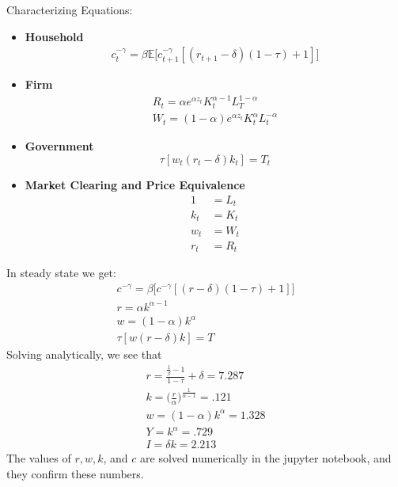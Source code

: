 \documentclass[12pt]{article}
\newenvironment{problem}[2][Problem]{\begin{trivlist}
\item[\hskip \labelsep {\bfseries #1}\hskip \labelsep {\bfseries #2.}]}{\end{trivlist}}
\theoremstyle{definition}
\theoremstyle{definition}
\theoremstyle{definition}
\theoremstyle{definition}
\begin{document}
\begin{problem}{5} Characterizing Equations:
\begin{itemize}
\item \textbf{Household}
\begin{align}
c_t^{-\gamma} = \beta \mathbb{E} \big[ c_{t+1}^{-\gamma}[(r_{t+1}-\delta)(1-\tau) +1] \big]
\end{align}

\item \textbf{Firm}
\begin{align}
R_t = \alpha e^{\alpha z_t} K_t^{\alpha - 1} L_T^{1-\alpha} \\
W_t = (1 - \alpha) e^{\alpha z_t} K_t^\alpha L_t^{- \alpha}
\end{align}

\item \textbf{Government}
\begin{equation}
\tau[w_t(r_t - \delta)k_t] = T_t
\end{equation}
\item \textbf{Market Clearing and Price Equivalence}
\begin{align}
1 &= L_t \\
k_t &= K_t \\
w_t &= W_t \\
r_t &= R_t 
\end{align}

\end{itemize}
In steady state we get:
\begin{align}
c^{-\gamma} = \beta \big[ c^{-\gamma}[(r-\delta)(1-\tau)+1] \big] \\
r = \alpha k^{\alpha - 1} \\
w = (1 - \alpha)  k^\alpha \\
\tau[w(r - \delta)k] = T
\end{align}
Solving analytically, we see that 
\begin{align}
r = \frac{\frac{1}{\beta} - 1}{1 - \tau} + \delta = 7.287 \\
k = \Big( \frac{r}{\alpha} \Big)^{\frac{1}{\alpha - 1}} = .121 \\
w = (1 - \alpha) k^\alpha = 1.328 \\
Y = k^\alpha = .729 \\
I = \delta k = 2.213
\end{align}
The values of $r, w, k$, and $c$ are solved numerically in the jupyter notebook, and they confirm these numbers.
\end{problem}
\end{document}
